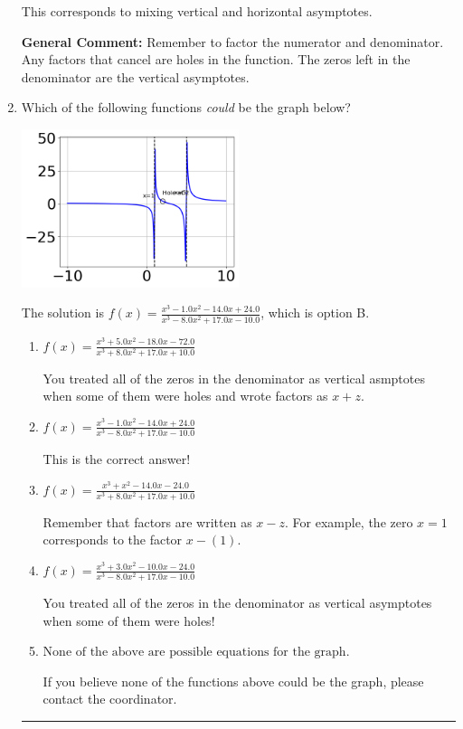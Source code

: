 \documentclass{extbook}[14pt]
\newcommand{\litem}[1]{\item #1

\rule{\textwidth}{0.4pt}}
\begin{document}
\begin{enumerate}
{\begin{enumerate}[label=\Alph*.]
This corresponds to mixing vertical and horizontal asymptotes.
\end{enumerate}

\textbf{General Comment:} Remember to factor the numerator and denominator. Any factors that cancel are holes in the function. The zeros left in the denominator are the vertical asymptotes.
}
\litem{
Which of the following functions \textit{could} be the graph below?

\begin{center}
    \includegraphics[width=0.5\textwidth]{../Figures/identifyGraphOfRationalFunctionCopyB.png}
\end{center}


The solution is \( f(x)=\frac{x^{3} -1.0 x^{2} -14.0 x + 24.0}{x^{3} -8.0 x^{2} +17.0 x -10.0} \), which is option B.\begin{enumerate}[label=\Alph*.]
\item \( f(x)=\frac{x^{3} +5.0 x^{2} -18.0 x -72.0}{x^{3} +8.0 x^{2} +17.0 x + 10.0} \)

You treated all of the zeros in the denominator as vertical asmptotes when some of them were holes and wrote factors as $x+z$.
\item \( f(x)=\frac{x^{3} -1.0 x^{2} -14.0 x + 24.0}{x^{3} -8.0 x^{2} +17.0 x -10.0} \)

This is the correct answer!
\item \( f(x)=\frac{x^{3} + x^{2} -14.0 x -24.0}{x^{3} +8.0 x^{2} +17.0 x + 10.0} \)

Remember that factors are written as $x-z$. For example, the zero $x=1$ corresponds to the factor $x-(1)$.
\item \( f(x)=\frac{x^{3} +3.0 x^{2} -10.0 x -24.0}{x^{3} -8.0 x^{2} +17.0 x -10.0} \)

You treated all of the zeros in the denominator as vertical asymptotes when some of them were holes!
\item \( \text{None of the above are possible equations for the graph.} \)

If you believe none of the functions above could be the graph, please contact the coordinator.
\end{enumerate}

}
\end{enumerate}
\end{document}
